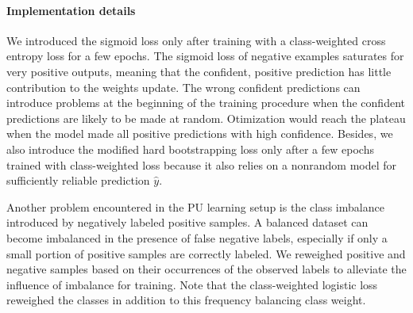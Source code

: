 \paragraph{Implementation details}
We introduced the sigmoid loss only after training with a class-weighted cross entropy loss for a few epochs.
The sigmoid loss of negative examples saturates for very positive outputs, meaning that the confident, positive prediction has little contribution to the weights update.
The wrong confident predictions can introduce problems at the beginning of the training procedure when the confident predictions are likely to be made at random.
Otimization would reach the plateau when the model made all positive predictions with high confidence.
Besides, we also introduce the modified hard bootstrapping loss only after a few epochs trained with class-weighted loss because it also relies on a nonrandom model for sufficiently reliable prediction $\hat{y}$.



Another problem encountered in the PU learning setup is the class imbalance introduced by negatively labeled positive samples.
A balanced dataset can become imbalanced in the presence of false negative labels, especially if only a small portion of positive samples are correctly labeled.
We reweighed positive and negative samples based on their occurrences of the observed labels to alleviate the influence of imbalance for training.
Note that the class-weighted logistic loss reweighed the classes in addition to this frequency balancing class weight.
